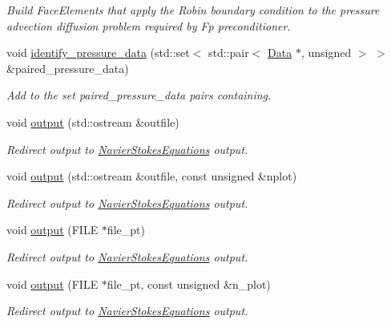 \begin{DoxyCompactItemize}
\begin{DoxyCompactList}\small\item\em Build Face\+Elements that apply the Robin boundary condition to the pressure advection diffusion problem required by Fp preconditioner. \end{DoxyCompactList}\item 
void \hyperlink{classoomph_1_1AxisymmetricTCrouzeixRaviartElement_af65900dbadfec7b6e7ad2be8ef63c51c}{identify\+\_\+pressure\+\_\+data} (std\+::set$<$ std\+::pair$<$ \hyperlink{classoomph_1_1Data}{Data} $\ast$, unsigned $>$ $>$ \&paired\+\_\+pressure\+\_\+data)
\begin{DoxyCompactList}\small\item\em Add to the set {\ttfamily paired\+\_\+pressure\+\_\+data} pairs containing. \end{DoxyCompactList}\item 
void \hyperlink{classoomph_1_1AxisymmetricTCrouzeixRaviartElement_a25336476c872ea2e5c26698f44d7d35d}{output} (std\+::ostream \&outfile)
\begin{DoxyCompactList}\small\item\em Redirect output to \hyperlink{classoomph_1_1NavierStokesEquations}{Navier\+Stokes\+Equations} output. \end{DoxyCompactList}\item 
void \hyperlink{classoomph_1_1AxisymmetricTCrouzeixRaviartElement_ae59a58576380d29570f9ea326d653e5b}{output} (std\+::ostream \&outfile, const unsigned \&nplot)
\begin{DoxyCompactList}\small\item\em Redirect output to \hyperlink{classoomph_1_1NavierStokesEquations}{Navier\+Stokes\+Equations} output. \end{DoxyCompactList}\item 
void \hyperlink{classoomph_1_1AxisymmetricTCrouzeixRaviartElement_ad5cb068224ac067b234de78e67866bb6}{output} (F\+I\+LE $\ast$file\+\_\+pt)
\begin{DoxyCompactList}\small\item\em Redirect output to \hyperlink{classoomph_1_1NavierStokesEquations}{Navier\+Stokes\+Equations} output. \end{DoxyCompactList}\item 
void \hyperlink{classoomph_1_1AxisymmetricTCrouzeixRaviartElement_aeec639f7ae884f7dd7f1d33ad63ba0b2}{output} (F\+I\+LE $\ast$file\+\_\+pt, const unsigned \&n\+\_\+plot)
\begin{DoxyCompactList}\small\item\em Redirect output to \hyperlink{classoomph_1_1NavierStokesEquations}{Navier\+Stokes\+Equations} output. \end{DoxyCompactList}\item 

\end{DoxyCompactItemize}
